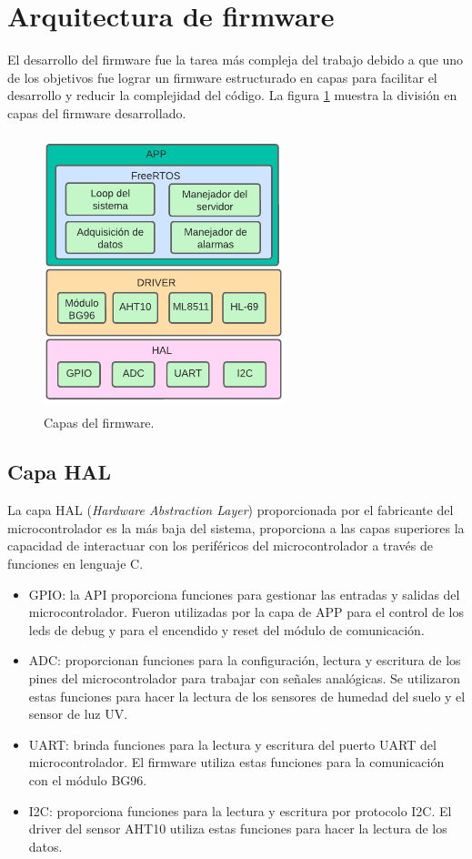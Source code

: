 \section{Arquitectura de firmware}
El desarrollo del firmware fue la tarea más compleja del trabajo debido a que uno de los objetivos fue lograr un firmware estructurado en capas para facilitar el desarrollo y reducir la complejidad del código. La figura \ref{fig:Capas del firmware} muestra la división en capas del firmware desarrollado.

\begin{figure}[h]
  \centering
	\includegraphics[width=7cm, height=8cm]{./Figures/Capas del firmware.png}
	\caption{Capas del firmware.}
	\label{fig:Capas del firmware}
\end{figure}

\subsection{Capa HAL} 
La capa HAL (\textit{Hardware Abstraction Layer}) proporcionada por el fabricante del microcontrolador  es la más baja del sistema, proporciona a las capas superiores la capacidad de interactuar con los periféricos del  microcontrolador a través de funciones en lenguaje C.
\begin{itemize}
  \item GPIO: la API proporciona funciones  para gestionar las entradas y salidas del microcontrolador. Fueron utilizadas por la capa de APP para el control de los leds de debug y para el encendido y reset del módulo de comunicación.
  \item ADC: proporcionan funciones para la configuración, lectura y escritura de los pines del microcontrolador para trabajar con señales analógicas. Se utilizaron estas funciones para hacer la lectura de los sensores de humedad del suelo y el sensor de luz UV.
  \item UART: brinda funciones para la lectura y escritura del puerto UART del microcontrolador. El firmware utiliza estas funciones para la comunicación con el módulo BG96.
  \item I2C: proporciona funciones para la lectura y escritura por protocolo I2C. El driver del sensor AHT10 utiliza estas funciones para hacer la lectura de los datos.
\end{itemize}

